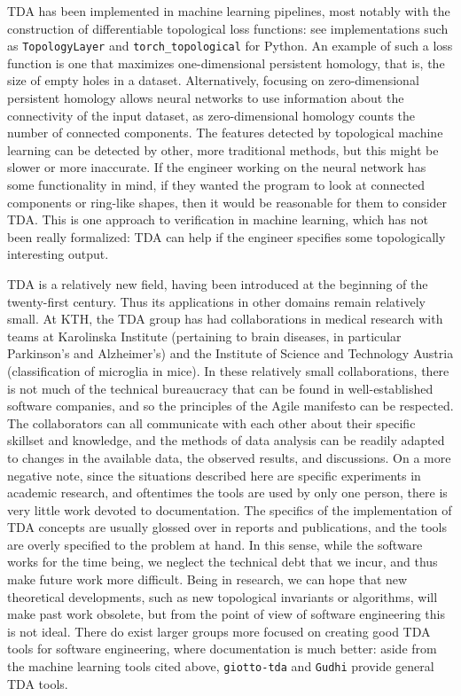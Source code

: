 \documentclass[11pt, oneside]{article}
\begin{document}
TDA has been implemented in machine learning pipelines, most notably with the construction of differentiable topological loss functions: see implementations such as \verb|TopologyLayer| \cite{GNDS2020} and \verb|torch_topological| \cite{HMR2021} for Python. An example of such a loss function is one that maximizes one-dimensional persistent homology, that is, the size of empty holes in a dataset. Alternatively, focusing on zero-dimensional persistent homology allows neural networks to use information about the connectivity of the input dataset, as zero-dimensional homology counts the number of connected components. The features detected by topological machine learning can be detected by other, more traditional methods, but this might be slower or more inaccurate. If the engineer working on the neural network has some functionality in mind, if they wanted the program to look at connected components or ring-like shapes, then it would be reasonable for them to consider TDA. This is one approach to verification in machine learning, which has not been really formalized: TDA can help if the engineer specifies some topologically interesting output.

TDA is a relatively new field, having been introduced at the beginning of the twenty-first century. Thus its applications in other domains remain relatively small. At KTH, the TDA group has had collaborations in medical research with teams at Karolinska Institute (pertaining to brain diseases, in particular Parkinson’s and Alzheimer’s) and the Institute of Science and Technology Austria (classification of microglia in mice). In these relatively small collaborations, there is not much of the technical bureaucracy that can be found in well-established software companies, and so the principles of the Agile manifesto can be respected. The collaborators can all communicate with each other about their specific skillset and knowledge, and the methods of data analysis can be readily adapted to changes in the available data, the observed results, and discussions. On a more negative note, since the situations described here are specific experiments in academic research, and oftentimes the tools are used by only one person, there is very little work devoted to documentation. The specifics of the implementation of TDA concepts are usually glossed over in reports and publications, and the tools are overly specified to the problem at hand. In this sense, while the software works for the time being, we neglect the technical debt that we incur, and thus make future work more difficult. Being in research, we can hope that new theoretical developments, such as new topological invariants or algorithms, will make past work obsolete, but from the point of view of software engineering this is not ideal. There do exist larger groups more focused on creating good TDA tools for software engineering, where documentation is much better: aside from the machine learning tools cited above, \verb|giotto-tda| \cite{TLTPCMDH2021} and \verb|Gudhi| \cite{MBGY2014} provide general TDA tools.\\
\end{document}
